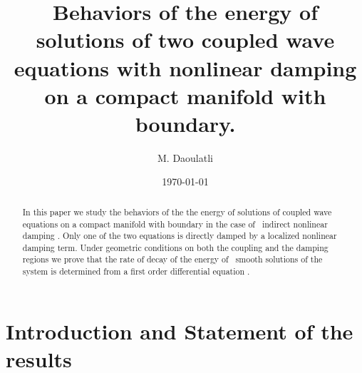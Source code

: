 \documentclass[11pt,reqno]{amsart}
\theoremstyle{plain}
\numberwithin{equation}{section}
\numberwithin{equation}{section}
\begin{document}
\title[Stabilization of coupled wave]{Behaviors of the energy of solutions
of two coupled wave equations with nonlinear damping on a compact manifold
with boundary.}
\author{M. Daoulatli}
\address{University of Dammam, King Saudi Arabia \& University of Carthage,
Tunisia}
\date{\today }

\begin{abstract}
In this paper we study the behaviors of the the energy of solutions of
coupled wave equations on a compact manifold with boundary in the case of \
indirect nonlinear damping . Only one of the two equations is directly
damped by a localized nonlinear damping term. Under geometric conditions on
both the coupling and the damping regions we prove that the rate of decay of
the energy of \ smooth solutions of the system is determined from a first
order differential equation .
\end{abstract}

\maketitle

\section{Introduction and Statement of the results}
\end{document}
